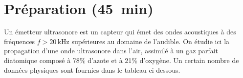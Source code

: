 



\section{Préparation (\SI{45}{min})}
Un émetteur ultrasonore est un capteur qui émet des ondes acoustiques à des fréquences $f > 20 \, \mathrm{kHz}$ supérieures au domaine de l'audible. On étudie ici la propagation d'une onde ultrasonore dans l'air, assimilé à un gaz parfait diatomique composé à 78\% d'azote et à 21\% d'oxygène. Un certain nombre de données physiques sont fournies dans le tableau ci-dessous.

